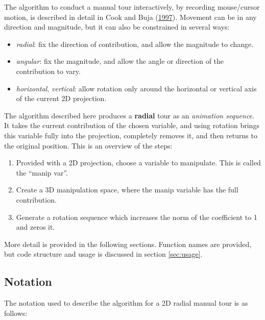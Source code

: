 The algorithm to conduct a manual tour interactively, by recording
mouse/cursor motion, is described in detail in Cook and Buja
(\protect\hyperlink{ref-cook_manual_1997}{1997}). Movement can be in any
direction and magnitude, but it can also be constrained in several ways:

\begin{itemize}
\tightlist
\item
  \emph{radial}: fix the direction of contribution, and allow the
  magnitude to change.
\item
  \emph{angular}: fix the magnitude, and allow the angle or direction of
  the contribution to vary.
\item
  \emph{horizontal}, \emph{vertical}: allow rotation only around the
  horizontal or vertical axis of the current 2D projection.
\end{itemize}

The algorithm described here produces a \textbf{radial} tour as an
\emph{animation sequence}. It takes the current contribution of the
chosen variable, and using rotation brings this variable fully into the
projection, completely removes it, and then returns to the original
position. This is an overview of the steps:

\begin{enumerate}
\def\labelenumi{\arabic{enumi}.}
\tightlist
\item
  Provided with a 2D projection, choose a variable to manipulate. This
  is called the ``manip var''.
\item
  Create a 3D manipulation space, where the manip variable has the full
  contribution.
\item
  Generate a rotation sequence which increases the norm of the
  coefficient to 1 and zeros it.
\end{enumerate}

More detail is provided in the following sections. Function names are
provided, but code structure and usage is discussed in section
\ref{sec:usage}.

\hypertarget{notation}{%
\subsection{Notation}\label{notation}}

The notation used to describe the algorithm for a 2D radial manual tour
is as follows:

